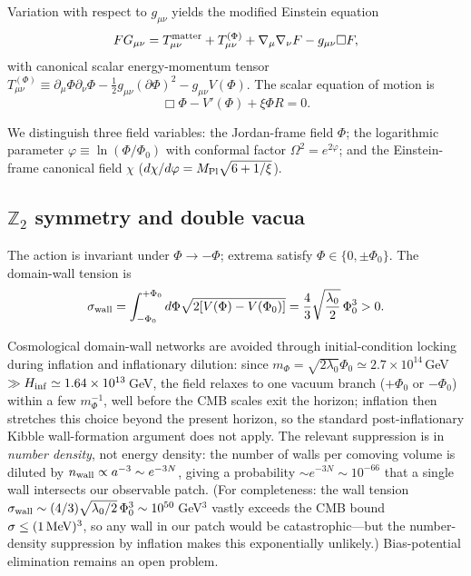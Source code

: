 \documentclass[pdflatex,sn-mathphys-num]{sn-jnl}
\newcommand{\MP}{M_{\rm Pl}}
\newcommand{\Ztwo}{\mathbb{Z}_2}
\newcommand{\PhiV}{\Phi_0}
\theoremstyle{thmstyleone}
\begin{document}
Variation with respect to $g_{\mu\nu}$ yields the modified Einstein equation
\begin{equation}
F G_{\mu\nu}=T^{\rm matter}_{\mu\nu}+T^{(\Phi)}_{\mu\nu}+\nabla_\mu\nabla_\nu F-g_{\mu\nu}\Box F,
\label{eq:einstein}
\end{equation}
with canonical scalar energy-momentum tensor $T^{(\Phi)}_{\mu\nu}\equiv\partial_\mu\Phi\partial_\nu\Phi-\frac12 g_{\mu\nu}(\partial\Phi)^2-g_{\mu\nu}V(\Phi)$. The scalar equation of motion is
\begin{equation}
\Box\Phi-V'(\Phi)+\xi\Phi R=0.
\label{eq:scalareom}
\end{equation}

We distinguish three field variables: the Jordan-frame field $\Phi$; the logarithmic parameter $\varphi\equiv\ln(\Phi/\PhiV)$ with conformal factor $\Omega^2=e^{2\varphi}$; and the Einstein-frame canonical field $\chi$ ($d\chi/d\varphi=\MP\sqrt{6+1/\xi}$).

\subsection{$\Ztwo$ symmetry and double vacua}

The action is invariant under $\Phi\to-\Phi$; extrema satisfy $\Phi\in\{0,\pm\PhiV\}$. The domain-wall tension is
\begin{equation}
\sigma_{\rm wall}=\int_{-\PhiV}^{+\PhiV}d\Phi\sqrt{2[V(\Phi)-V(\PhiV)]}
=\frac43\sqrt{\frac{\lambda_0}{2}}\,\PhiV^3>0.
\label{eq:sigma}
\end{equation}

Cosmological domain-wall networks are avoided through initial-condition locking during inflation and inflationary dilution: since $m_\Phi=\sqrt{2\lambda_0}\PhiV\simeq2.7\times10^{14}\,$GeV $\gg H_{\rm inf}\simeq1.64\times10^{13}\,$GeV, the field relaxes to one vacuum branch ($+\PhiV$ or $-\PhiV$) within a few $m_\Phi^{-1}$, well before the CMB scales exit the horizon; inflation then stretches this choice beyond the present horizon, so the standard post-inflationary Kibble wall-formation argument does not apply. The relevant suppression is in \emph{number density}, not energy density: the number of walls per comoving volume is diluted by $n_{\rm wall}\propto a^{-3}\sim e^{-3N}$, giving a probability $\sim e^{-3N}\sim10^{-66}$ that a single wall intersects our observable patch. (For completeness: the wall tension $\sigma_{\rm wall}\sim(4/3)\sqrt{\lambda_0/2}\,\PhiV^3\sim10^{50}\,$GeV$^3$ vastly exceeds the CMB bound $\sigma\leq(1\,{\rm MeV})^3$, so any wall in our patch would be catastrophic---but the number-density suppression by inflation makes this exponentially unlikely.) Bias-potential elimination remains an open problem.
\end{document}
